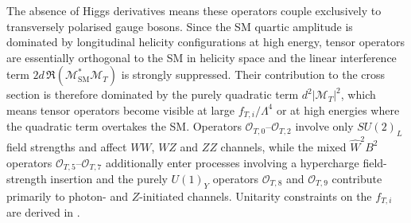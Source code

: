The absence of Higgs derivatives means these operators couple exclusively to transversely polarised gauge bosons. Since the SM quartic amplitude is dominated by longitudinal helicity configurations at high energy, tensor operators are essentially orthogonal to the SM in helicity space and the linear interference term $2d\,\Re(\mathcal{M}_{\mathrm{SM}}^{*}\mathcal{M}_{T})$ is strongly suppressed. Their contribution to the cross section is therefore dominated by the purely quadratic term $d^{2}|\mathcal{M}_{T}|^{2}$, which means tensor operators become visible at large $f_{T,i}/\Lambda^4$ or at high energies where the quadratic term overtakes the SM. Operators $\mathcal{O}_{T,0}$--$\mathcal{O}_{T,2}$ involve only $SU(2)_L$ field strengths and affect $WW$, $WZ$ and $ZZ$ channels, while the mixed $\hat{W}^2B^2$ operators $\mathcal{O}_{T,5}$--$\mathcal{O}_{T,7}$ additionally enter processes involving a hypercharge field-strength insertion and the purely $U(1)_Y$ operators $\mathcal{O}_{T,8}$ and $\mathcal{O}_{T,9}$ contribute primarily to photon- and $Z$-initiated channels. Unitarity constraints on the $f_{T,i}$ are derived in \cite{PhysRevD.101.113003}.